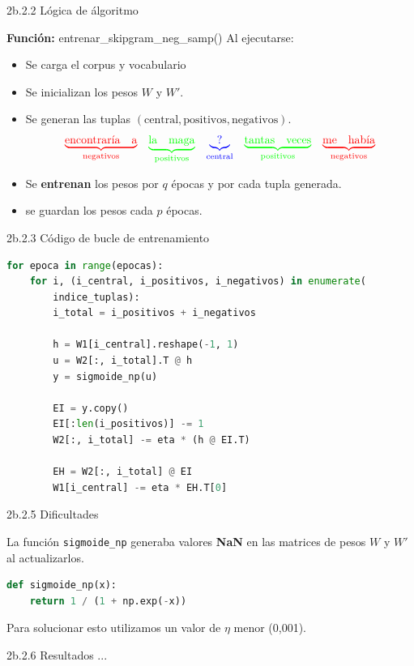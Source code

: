 \documentclass{beamer}
\begin{document}
\begin{frame}{2b.2.2 Lógica de álgoritmo}
	\begin{block}{\textbf{Función:} entrenar\_skipgram\_neg\_samp()}
		Al ejecutarse:
		\begin{itemize}
			\item Se carga el corpus y vocabulario
			\item Se inicializan los pesos $W$ y $W'$.
			\item Se generan las tuplas $(\text{central}, \text{positivos}, \text{negativos})$.
			\[
			\begin{array}{ccccc}
				\textcolor{red}{\underbrace{\text{encontraría}\quad \text{a}}_{\text{negativos}}} &
				\textcolor{green}{\underbrace{\text{la}\quad \text{maga}}_{\text{positivos}}} &
				\textcolor{blue}{\underbrace{\text{?}}_{\text{central}}} &
				\textcolor{green}{\underbrace{\text{tantas}\quad \text{veces}}_{\text{positivos}}} &
				\textcolor{red}{\underbrace{\text{me}\quad \text{había}}_{\text{negativos}}}
			\end{array}
			\]
			\item Se \textbf{entrenan} los pesos por $q$ épocas y por cada tupla generada.
			\item se guardan los pesos cada $p$ épocas.
		\end{itemize}
	\end{block}
	
\end{frame}

\begin{frame}[fragile]{2b.2.3 Código de bucle de entrenamiento}
	\justifying
	\begin{lstlisting}[language=Python]
for epoca in range(epocas):
	for i, (i_central, i_positivos, i_negativos) in enumerate(
		indice_tuplas):
		i_total = i_positivos + i_negativos
		
		h = W1[i_central].reshape(-1, 1)
		u = W2[:, i_total].T @ h
		y = sigmoide_np(u)
		
		EI = y.copy()
		EI[:len(i_positivos)] -= 1
		W2[:, i_total] -= eta * (h @ EI.T)
		
		EH = W2[:, i_total] @ EI
		W1[i_central] -= eta * EH.T[0]
	\end{lstlisting}
\end{frame}


\begin{frame}[fragile]{2b.2.5 Dificultades}
	\justifying
	\begin{block}{}
		La función \texttt{sigmoide\_np} generaba valores \textbf{NaN} en las matrices de pesos $W$ y $W'$ al actualizarlos.
	\end{block}
	
	\begin{lstlisting}[language=Python]
def sigmoide_np(x):
	return 1 / (1 + np.exp(-x))
	\end{lstlisting}
	
	\begin{block}{}
		Para solucionar esto utilizamos un valor de $\eta$ menor (0,001).
	\end{block}
	
\end{frame}

\begin{frame}{2b.2.6 Resultados}
	...
\end{frame}
\end{document}
